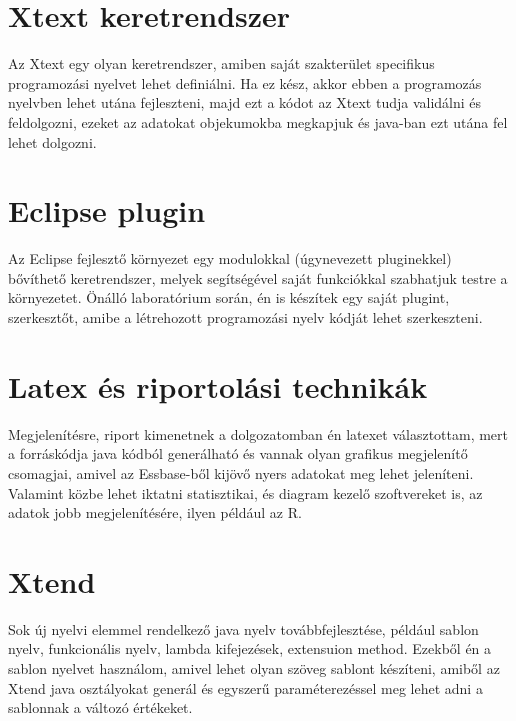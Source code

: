 \section{Xtext keretrendszer}
Az Xtext egy olyan keretrendszer, amiben saját szakterület specifikus programozási nyelvet lehet definiálni. Ha ez kész, akkor ebben a programozás nyelvben lehet utána fejleszteni, majd ezt a kódot az Xtext tudja validálni és feldolgozni, ezeket az adatokat objekumokba megkapjuk és java-ban ezt utána fel lehet dolgozni.

\section{Eclipse plugin}
Az Eclipse fejlesztő környezet egy modulokkal (úgynevezett pluginekkel) bővíthető keretrendszer, melyek segítségével saját funkciókkal szabhatjuk testre a környezetet. Önálló laboratórium során, én is készítek egy saját plugint, szerkesztőt, amibe a létrehozott programozási nyelv kódját lehet szerkeszteni.

\section{Latex és riportolási technikák}
Megjelenítésre, riport kimenetnek a dolgozatomban én latexet választottam, mert a forráskódja java kódból generálható és vannak olyan grafikus megjelenítő csomagjai, amivel az Essbase-ből kijövő nyers adatokat meg lehet jeleníteni. Valamint közbe lehet iktatni statisztikai, és diagram kezelő szoftvereket is, az adatok jobb megjelenítésére, ilyen például az R.

\section{Xtend}
Sok új nyelvi elemmel rendelkező java nyelv továbbfejlesztése, például sablon nyelv, funkcionális nyelv, lambda kifejezések, extensuion method. Ezekből én a sablon nyelvet használom, amivel lehet olyan szöveg sablont készíteni, amiből az Xtend java osztályokat generál és egyszerű paraméterezéssel meg lehet adni a sablonnak a változó értékeket.

